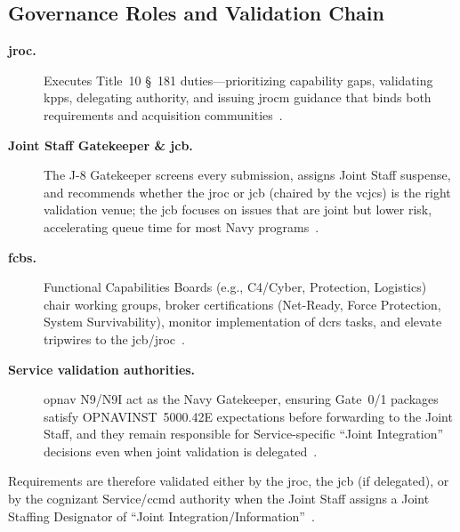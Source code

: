 \documentclass[../main.tex]{subfiles}
\begin{document}
\subsection{Governance Roles and Validation Chain}
\begin{description}
	\item[\textbf{\ac{jroc}.}] Executes Title~10 \S~181 duties---prioritizing capability gaps, validating \acp{kpp}, delegating authority, and issuing \ac{jrocm} guidance that binds both requirements and acquisition communities~\autocite{jcids-manual-2021,USC-10-181}.
	\item[\textbf{Joint Staff Gatekeeper \& \ac{jcb}.}] The J-8 Gatekeeper screens every submission, assigns Joint Staff suspense, and recommends whether the \ac{jroc} or \ac{jcb} (chaired by the \ac{vcjcs}) is the right validation venue; the \ac{jcb} focuses on issues that are joint but lower risk, accelerating queue time for most Navy programs~\autocite{jcids-manual-2021}.
	\item[\textbf{\acp{fcb}.}] Functional Capabilities Boards (e.g., C4/Cyber, Protection, Logistics) chair working groups, broker certifications (Net-Ready, Force Protection, System Survivability), monitor implementation of \acp{dcr} tasks, and elevate tripwires to the \ac{jcb}/\ac{jroc}~\autocite{jcids-manual-2021}.
	\item[\textbf{Service validation authorities.}] \ac{opnav} N9/N9I act as the Navy Gatekeeper, ensuring Gate~0/1 packages satisfy OPNAVINST~5000.42E expectations before forwarding to the Joint Staff, and they remain responsible for Service-specific ``Joint Integration'' decisions even when joint validation is delegated~\autocite{OPNAVINST5000-42E}.
\end{description}
Requirements are therefore validated either by the \ac{jroc}, the \ac{jcb} (if delegated), or by the cognizant Service/\ac{ccmd} authority when the Joint Staff assigns a Joint Staffing Designator of ``Joint Integration/Information''~\autocite{jcids-manual-2021}.
\end{document}
